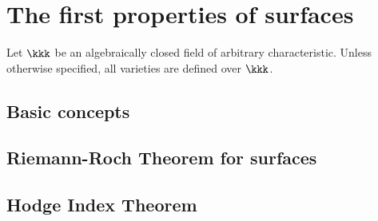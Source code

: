 \section{The first properties of surfaces}

Let \(\kkk\) be an algebraically closed field of arbitrary characteristic.
Unless otherwise specified, all varieties are defined over \(\kkk\).

\subsection{Basic concepts}


\subsection{Riemann-Roch Theorem for surfaces}


\subsection{Hodge Index Theorem}